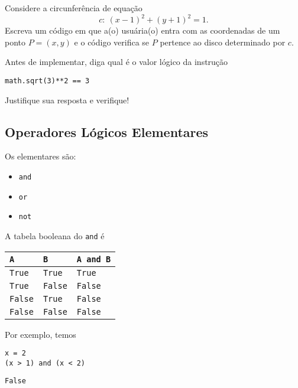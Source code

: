 \documentclass[12pt]{article}
\begin{document}
\begin{exr}
  Considere a circunferência de equação
  \begin{equation}
    c: ~(x - 1)^2 + (y + 1)^2 = 1.
  \end{equation}
  Escreva um código em que a(o) usuária(o) entra com as coordenadas de um ponto $P = (x, y)$ e o código verifica se $P$ pertence ao disco determinado por $c$.
\end{exr}

\begin{exr}
  Antes de implementar, diga qual é o valor lógico da instrução

\begin{lstlisting}
math.sqrt(3)**2 == 3
\end{lstlisting}

Justifique sua resposta e verifique!
\end{exr}

\subsection{Operadores Lógicos Elementares}

Os  elementares são:
\begin{itemize}
\item[]\texttt{and} 
\item[]\texttt{or} 
\item[]\texttt{not} 
\end{itemize}

\begin{ex}
  A tabela booleana{\boole} do \texttt{and} é
  \begin{center}
    \begin{tabular}[H]{ll|l}
      \texttt{A} & \texttt{B} & \texttt{A and B}\\\hline
      \texttt{True} & \texttt{True} & \texttt{True} \\
      \texttt{True} & \texttt{False} & \texttt{False} \\
      \texttt{False} & \texttt{True} & \texttt{False} \\
      \texttt{False} & \texttt{False} & \texttt{False} \\\hline
    \end{tabular}
  \end{center}

  Por exemplo, temos

\begin{lstlisting}
x = 2
(x > 1) and (x < 2)
\end{lstlisting}

\begin{verbatim}
False
\end{verbatim}

\end{ex}
\end{document}
